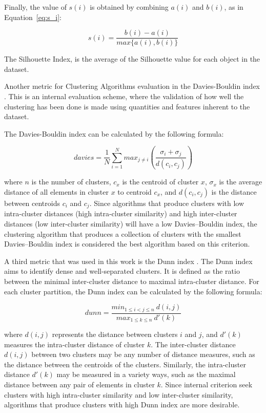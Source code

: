 \documentclass[conference]{IEEEtran}
\begin{document}
	
	Finally, the value of $s(i)$ is obtained by combining $a(i)$ and $b(i)$, as in  Equation~\ref{eq:s_i}:
	
	
	\begin{equation} \label{eq:s_i}
	s(i) = \frac{b(i) - a(i)}{max\{a(i), b(i)\}}
	\end{equation}
	
	The Silhouette Index, is the average of the Silhouette value for each object in the dataset.
	
	Another metric for Clustering Algorithms evaluation in the Davies-Bouldin index \cite{davies1979cluster}. This is an internal evaluation scheme, where the validation of how well the clustering has been done is made using quantities and features inherent to the dataset.
	
	The Davies-Bouldin index can be calculated by the following formula:
	
	\begin{equation} \label{eq:davies}
		davies = \frac{1}{N} \sum_{i=1}^{N} max_{j \neq i} \left(\frac{\sigma_i + \sigma_j}{d(c_i, c_j)}\right)
	\end{equation}
	
	where $n$ is the number of clusters, $c_x$ is the centroid of cluster $x$, $\sigma_x$ is the average distance of all elements in cluster $x$ to centroid $c_x$, and $d(c_i, c_j)$ is the distance between centroids $c_i$ and $c_j$. Since algorithms that produce clusters with low intra-cluster distances (high intra-cluster similarity) and high inter-cluster distances (low inter-cluster similarity) will have a low Davies–Bouldin index, the clustering algorithm that produces a collection of clusters with the smallest Davies–Bouldin index is considered the best algorithm based on this criterion.
	
	
	A third metric that was used in this work is the Dunn index \cite{dunn1973fuzzy}. The Dunn index aims to identify dense and well-separated clusters. It is defined as the ratio between the minimal inter-cluster distance to maximal intra-cluster distance. For each cluster partition, the Dunn index can be calculated by the following formula:
	
	\begin{equation} \label{eq:dunn}
		dunn = \frac{min_{1\le i < j\le n}~d(i, j)}{max_{1\le k \le n}~d'(k)}
	\end{equation}
	
	
	where $d(i, j)$ represents the distance between clusters $i$ and $j$, and $d'(k)$ measures the intra-cluster distance of cluster $k$. The inter-cluster distance $d(i, j)$ between two clusters may be any number of distance measures, such as the distance between the centroids of the clusters. Similarly, the intra-cluster distance $d'(k)$ may be measured in a variety ways, such as the maximal distance between any pair of elements in cluster $k$. Since internal criterion seek clusters with high intra-cluster similarity and low inter-cluster similarity, algorithms that produce clusters with high Dunn index are more desirable.
	
\end{document}
